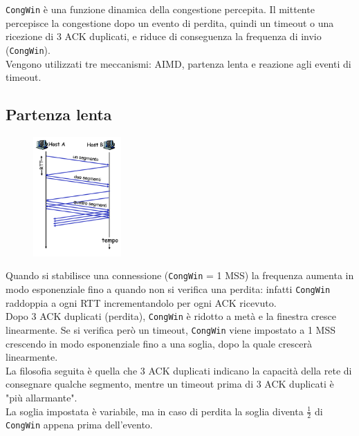 \documentclass{report}
\begin{document}
	\verb|CongWin| è una funzione dinamica della congestione percepita. Il mittente percepisce la congestione dopo un evento di perdita, quindi un timeout o una ricezione di 3 ACK duplicati, e riduce di conseguenza la frequenza di invio (\verb|CongWin|).
	\medskip\\Vengono utilizzati tre meccanismi: AIMD, partenza lenta e reazione agli eventi di timeout.
	\newpage
	\subsection{Partenza lenta}
	\begin{figure}
		\centering
		\vspace{-20pt}
		\includegraphics[width=0.3\textwidth]{partenza-lenta}
		\vspace{-50pt}
	\end{figure}
	Quando si stabilisce una connessione (\verb|CongWin| = 1 MSS) la frequenza aumenta in modo esponenziale fino a quando non si verifica una perdita: infatti \verb|CongWin| raddoppia a ogni RTT incrementandolo per ogni ACK ricevuto.
	\medskip\\Dopo 3 ACK duplicati (perdita), \verb|CongWin| è ridotto a metà e la finestra cresce linearmente. Se si verifica però un timeout, \verb|CongWin| viene impostato a 1 MSS crescendo in modo esponenziale fino a una soglia, dopo la quale crescerà linearmente.
	\medskip\\La filosofia seguita è quella che 3 ACK duplicati indicano la capacità della rete di consegnare qualche segmento, mentre un timeout prima di 3 ACK duplicati è "più allarmante".
	\medskip\\La soglia impostata è variabile, ma in caso di perdita la soglia diventa \(\frac{1}{2}\) di \verb|CongWin| appena prima dell'evento.
\end{document}

